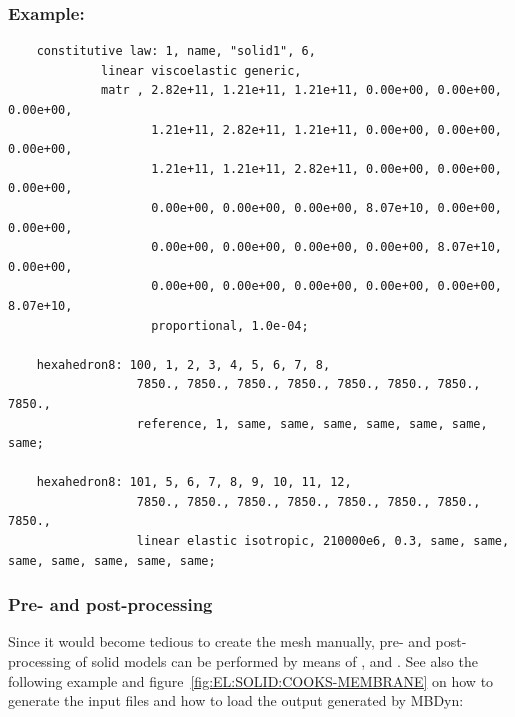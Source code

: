\subsubsection{Example:}
\begin{verbatim}
    constitutive law: 1, name, "solid1", 6,
             linear viscoelastic generic,
             matr , 2.82e+11, 1.21e+11, 1.21e+11, 0.00e+00, 0.00e+00, 0.00e+00,
                    1.21e+11, 2.82e+11, 1.21e+11, 0.00e+00, 0.00e+00, 0.00e+00,
                    1.21e+11, 1.21e+11, 2.82e+11, 0.00e+00, 0.00e+00, 0.00e+00,
                    0.00e+00, 0.00e+00, 0.00e+00, 8.07e+10, 0.00e+00, 0.00e+00,
                    0.00e+00, 0.00e+00, 0.00e+00, 0.00e+00, 8.07e+10, 0.00e+00,
                    0.00e+00, 0.00e+00, 0.00e+00, 0.00e+00, 0.00e+00, 8.07e+10,
                    proportional, 1.0e-04;

    hexahedron8: 100, 1, 2, 3, 4, 5, 6, 7, 8,
                  7850., 7850., 7850., 7850., 7850., 7850., 7850., 7850.,
                  reference, 1, same, same, same, same, same, same, same;

    hexahedron8: 101, 5, 6, 7, 8, 9, 10, 11, 12,
                  7850., 7850., 7850., 7850., 7850., 7850., 7850., 7850.,
                  linear elastic isotropic, 210000e6, 0.3, same, same, same, same, same, same, same;
\end{verbatim}

\subsubsection{Pre- and post-processing}
Since it would become tedious to create the mesh manually, pre- and post-processing of solid models
can be performed by means of ,
and .
See also the following example and figure~\ref{fig:EL:SOLID:COOKS-MEMBRANE} on how to generate the input files and how to load the output generated by MBDyn:

